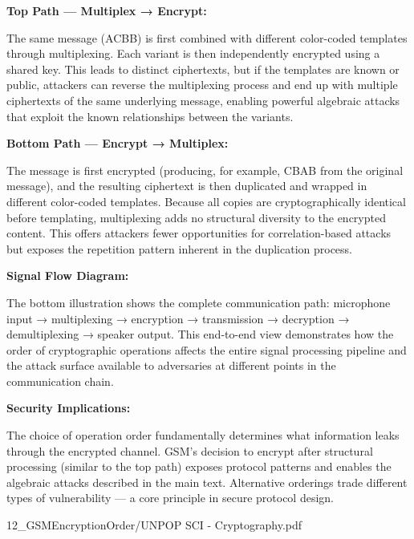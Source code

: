 \begin{SideNotePage}{
  \textbf{Top Path — Multiplex → Encrypt:} \par The same message (ACBB) is first combined with different color-coded templates through multiplexing. Each variant is then independently encrypted using a shared key. This leads to distinct ciphertexts, but if the templates are known or public, attackers can reverse the multiplexing process and end up with multiple ciphertexts of the same underlying message, enabling powerful algebraic attacks that exploit the known relationships between the variants.

  \vspace{1em}
  \textbf{Bottom Path — Encrypt → Multiplex:} \par The message is first encrypted (producing, for example, CBAB from the original message), and the resulting ciphertext is then duplicated and wrapped in different color-coded templates. Because all copies are cryptographically identical before templating, multiplexing adds no structural diversity to the encrypted content. This offers attackers fewer opportunities for correlation-based attacks but exposes the repetition pattern inherent in the duplication process.

  \vspace{1em}
  \textbf{Signal Flow Diagram:} \par The bottom illustration shows the complete communication path: microphone input → multiplexing → encryption → transmission → decryption → demultiplexing → speaker output. This end-to-end view demonstrates how the order of cryptographic operations affects the entire signal processing pipeline and the attack surface available to adversaries at different points in the communication chain.

  \vspace{1em}
  \textbf{Security Implications:} \par The choice of operation order fundamentally determines what information leaks through the encrypted channel. GSM's decision to encrypt after structural processing (similar to the top path) exposes protocol patterns and enables the algebraic attacks described in the main text. Alternative orderings trade different types of vulnerability — a core principle in secure protocol design.
}{12_GSMEncryptionOrder/UNPOP SCI - Cryptography.pdf}
\end{SideNotePage}